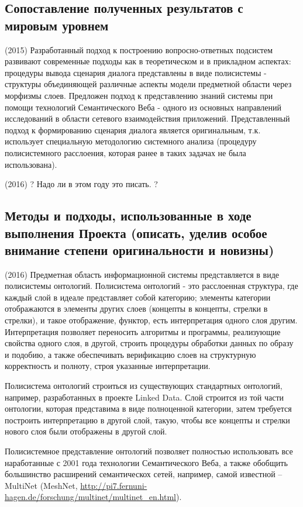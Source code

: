 \documentclass[12pt,a4paper]{ltxdoc}
\begin{document}
\subsection{Сопоставление полученных результатов с мировым уровнем}
(2015) Разработанный подход к построению вопросно-ответных подсистем развивают современные подходы как в теоретическом и в прикладном аспектах: процедуры вывода сценария диалога представлены в виде полисистемы - структуры объединяющей различные аспекты модели предметной области через морфизмы слоев. Предложен подход к представлению знаний системы при помощи технологий Семантического Веба - одного из основных направлений исследований в области сетевого взаимодействия приложений. Представленный подход к формированию сценария диалога является оригинальным, т.к. использует специальную методологию системного анализа (процедуру полисистемного расслоения, которая ранее в таких задачах не была использована).

(2016) ? Надо ли в этом году это писать. ?

\subsection{Методы и подходы, использованные в ходе выполнения Проекта (описать,
  уделив особое внимание степени оригинальности и новизны)}

(2016) Предметная область информационной системы представляется в виде полисистемы онтологий. Полисистема онтологий - это расслоенная структура, где каждый слой в идеале представляет собой категорию; элементы категории отображаются в элементы других слоев (концепты в концепты, стрелки в стрелки), и такое отображение, функтор, есть интерпретация одного слоя другим. Интерпретация позволяет переносить алгоритмы и программы, реализующие свойства одного слоя, в другой, строить процедуры обработки данных по образу и подобию, а также обеспечивать верификацию слоев на структурную корректность и полноту, строя указанные интерпретации.

Полисистема онтологий строиться из существующих стандартных онтологий, например, разработанных в проекте Linked Data. Слой строится из той части онтологии, которая представима в виде полноценной категории, затем требуется построить интерпретацию в другой слой, такую, чтобы все концепты и стрелки нового слоя были отображены в другой слой.

Полисистемное представление онтологий позволяет полностью использовать все наработанные с 2001 года технологии Семантического Веба, а также обобщить большинство расширений семантическох сетей, например, самой известной -- MultiNet (MeshNet, \url{http://pi7.fernuni-hagen.de/forschung/multinet/multinet_en.html}).
\end{document}

